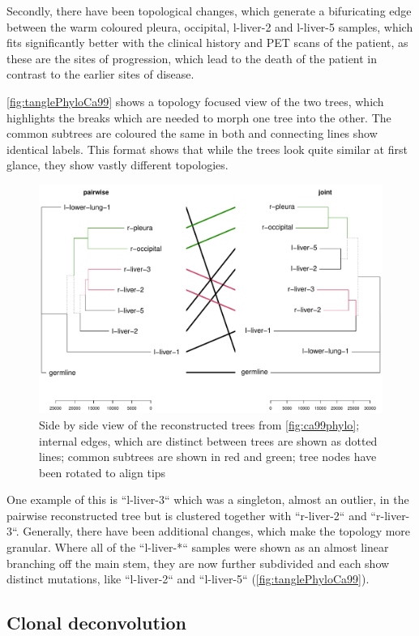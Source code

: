 Secondly, there have been topological changes, which generate a bifuricating edge between the warm coloured pleura, occipital, l-liver-2 and l-liver-5 samples, which fits significantly better with the clinical history and PET scans of the patient, as these are the sites of progression, which lead to the death of the patient in contrast to the earlier sites of disease.

\autoref{fig:tanglePhyloCa99} shows a topology focused view of the two trees, which highlights the breaks which are needed to morph one tree into the other. The common subtrees are coloured the same in both and connecting lines show identical labels. This format shows that while the trees look quite similar at first glance, they show vastly different topologies.

\begin{figure}[!ht]
\centering
\includegraphics[width=.99\linewidth]{Figures/tanglePhyloCA99.pdf}
\caption[Tanglegram of the reconstructed phylogenies]{Side by side view of the reconstructed trees from \autoref{fig:ca99phylo}; internal edges, which are distinct between trees are shown as dotted lines; common subtrees are shown in red and green; tree nodes have been rotated to align tips}\label{fig:tanglePhyloCa99}
\end{figure}

One example of this is ``l-liver-3`` which was a singleton, almost an outlier, in the pairwise reconstructed tree but is clustered together with ``r-liver-2`` and ``r-liver-3``. Generally, there have been additional changes, which make the topology more granular. Where all of the ``l-liver-*`` samples were shown as an almost linear branching off the main stem, they are now further subdivided and each show distinct mutations, like ``l-liver-2`` and ``l-liver-5`` (\autoref{fig:tanglePhyloCa99}).



\subsection[Clonal deconvolution]{Clonal deconvolution}
\label{variantcalling-sec:clonal}

